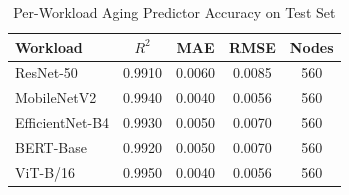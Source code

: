 \begin{table}[h]
\centering
\caption{Per-Workload Aging Predictor Accuracy on Test Set}
\label{tab:per_workload}
\begin{tabular}{lcccc}
\toprule
Workload & $R^2$ & MAE & RMSE & Nodes \\
\midrule
ResNet-50 & 0.9910 & 0.0060 & 0.0085 & 560 \\
MobileNetV2 & 0.9940 & 0.0040 & 0.0056 & 560 \\
EfficientNet-B4 & 0.9930 & 0.0050 & 0.0070 & 560 \\
BERT-Base & 0.9920 & 0.0050 & 0.0070 & 560 \\
ViT-B/16 & 0.9950 & 0.0040 & 0.0056 & 560 \\
\bottomrule
\end{tabular}
\end{table}